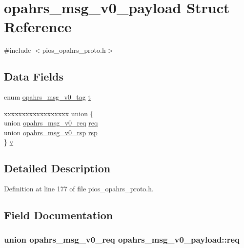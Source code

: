 \hypertarget{structopahrs__msg__v0__payload}{\section{opahrs\-\_\-msg\-\_\-v0\-\_\-payload Struct Reference}
\label{structopahrs__msg__v0__payload}
}


{\ttfamily \#include $<$pios\-\_\-opahrs\-\_\-proto.\-h$>$}

\subsection*{Data Fields}
\begin{DoxyCompactItemize}
\item 
enum \hyperlink{group___p_i_o_s___o_p_a_h_r_s_gaac8774f1c099b105b9117e7949bcf797}{opahrs\-\_\-msg\-\_\-v0\-\_\-tag} \hyperlink{structopahrs__msg__v0__payload_ab11688c3cb10ea64e20ecb0467cee991}{t}
\item 
\begin{tabbing}
xx\=xx\=xx\=xx\=xx\=xx\=xx\=xx\=xx\=\kill
union \{\\
\>union \hyperlink{unionopahrs__msg__v0__req}{opahrs\_msg\_v0\_req} \hyperlink{structopahrs__msg__v0__payload_ae693769b82fa4dad4a617238721ad9c0}{req}\\
\>union \hyperlink{unionopahrs__msg__v0__rsp}{opahrs\_msg\_v0\_rsp} \hyperlink{structopahrs__msg__v0__payload_aadee06f1ce237ba7dd5070d539b67c5c}{rsp}\\
\} \hyperlink{structopahrs__msg__v0__payload_a3230331387b25d07af10c4fab4e8adae}{v}\\

\end{tabbing}\end{DoxyCompactItemize}


\subsection{Detailed Description}


Definition at line 177 of file pios\-\_\-opahrs\-\_\-proto.\-h.



\subsection{Field Documentation}
\hypertarget{structopahrs__msg__v0__payload_ae693769b82fa4dad4a617238721ad9c0}{
\subsubsection[{req}]{\setlength{\rightskip}{0pt plus 5cm}union {\bf opahrs\-\_\-msg\-\_\-v0\-\_\-req} opahrs\-\_\-msg\-\_\-v0\-\_\-payload\-::req}}\label{structopahrs__msg__v0__payload_ae693769b82fa4dad4a617238721ad9c0}


